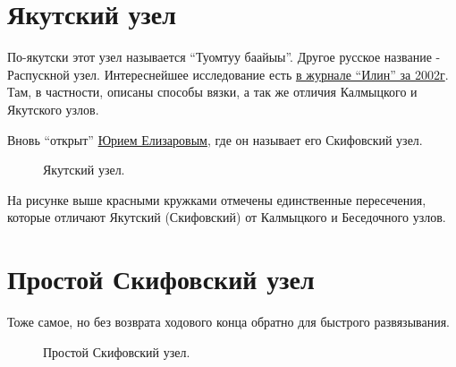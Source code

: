 \documentclass{artikel1}
\begin{document}
\section{Якутский узел}

По-якутски этот узел называется \enquote{Туомтуу баайыы}. Другое русское название - Распускной узел. Интереснейшее исследование есть \href{http://ilin-yakutsk.narod.ru/2002-4/savinov.htm}{в журнале \enquote{Илин} за 2002г}. Там, в частности, описаны способы вязки, а так же отличия Калмыцкого и Якутского узлов.

Вновь \enquote{открыт} \href{http://www.muzel.ru/article/za/skifovsky.htm}{Юрием Елизаровым}, где он называет его Скифовский узел.

\begin{figure}[H]\centering
	\subfloat[Результат]{\label{ris:Skif_1}
	\tcbox[enhanced jigsaw,colframe=black,opacityframe=0.5,opacityback=0.5]
		{\centering
			}
		}
\vfill
\hfill
	\caption{Якутский узел.}\label{ris:Skif}
\end{figure}

На рисунке выше красными кружками отмечены единственные пересечения, которые отличают Якутский (Скифовский) от Калмыцкого и Беседочного узлов.

\section{Простой Скифовский узел}

Тоже самое, но без возврата ходового конца обратно для быстрого развязывания.

\begin{figure}[H]\centering
	\begin{minipage}{1\linewidth}
		\begin{center}
			\tcbox[enhanced jigsaw,colframe=black,opacityframe=0.5,opacityback=0.5]
			{\centering{}}
		\end{center}
	\end{minipage}
\caption{Простой Скифовский узел.}
\label{ris:Skif_simpl}
\end{figure}
\end{document}

